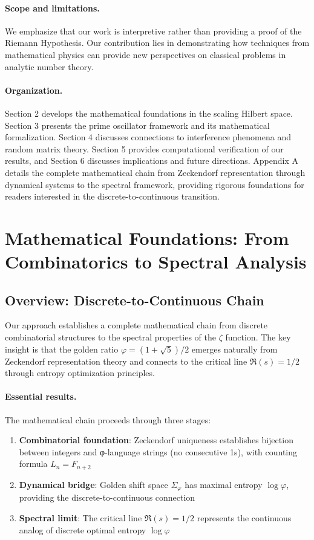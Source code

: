 \documentclass[12pt]{article}
\theoremstyle{plain}
\theoremstyle{definition}
\begin{document}
\paragraph{Scope and limitations.} We emphasize that our work is interpretive rather than providing a proof of the Riemann Hypothesis. Our contribution lies in demonstrating how techniques from mathematical physics can provide new perspectives on classical problems in analytic number theory.

\paragraph{Organization.} Section 2 develops the mathematical foundations in the scaling Hilbert space. Section 3 presents the prime oscillator framework and its mathematical formalization. Section 4 discusses connections to interference phenomena and random matrix theory. Section 5 provides computational verification of our results, and Section 6 discusses implications and future directions. Appendix A details the complete mathematical chain from Zeckendorf representation through dynamical systems to the spectral framework, providing rigorous foundations for readers interested in the discrete-to-continuous transition.

\section{Mathematical Foundations: From Combinatorics to Spectral Analysis}

\subsection{Overview: Discrete-to-Continuous Chain}

Our approach establishes a complete mathematical chain from discrete combinatorial structures to the spectral properties of the $\zeta$ function. The key insight is that the golden ratio $\varphi = (1+\sqrt{5})/2$ emerges naturally from Zeckendorf representation theory and connects to the critical line $\Re(s) = 1/2$ through entropy optimization principles.

\paragraph{Essential results.} The mathematical chain proceeds through three stages:
\begin{enumerate}
\item \textbf{Combinatorial foundation}: Zeckendorf uniqueness establishes bijection between integers and φ-language strings (no consecutive 1s), with counting formula $L_n = F_{n+2}$
\item \textbf{Dynamical bridge}: Golden shift space $\Sigma_\varphi$ has maximal entropy $\log \varphi$, providing the discrete-to-continuous connection
\item \textbf{Spectral limit}: The critical line $\Re(s) = 1/2$ represents the continuous analog of discrete optimal entropy $\log \varphi$
\end{enumerate}
\end{document}
